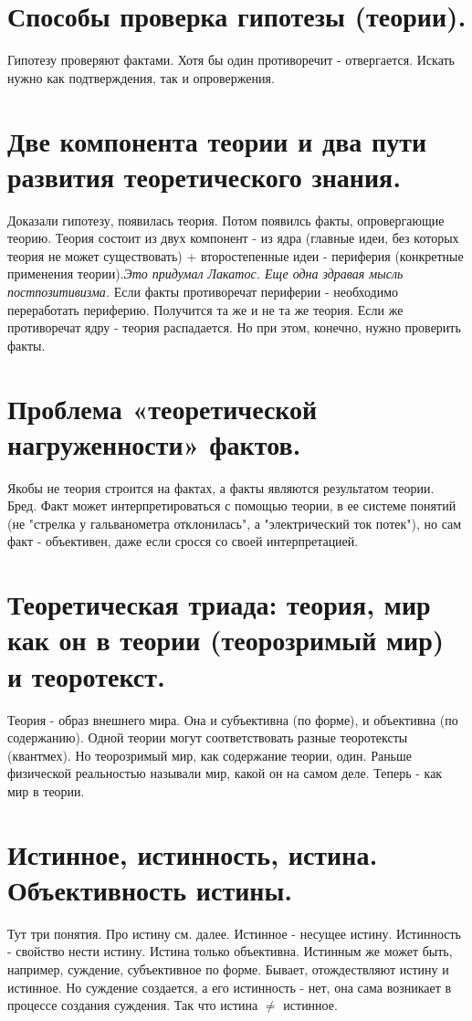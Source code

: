 \section{ Способы проверка гипотезы (теории).}
Гипотезу проверяют фактами. Хотя бы один противоречит - отвергается. Искать нужно как подтверждения, так и опровержения.

\section{ Две компонента теории и два пути развития теоретического знания.}
Доказали гипотезу, появилась теория. Потом появилсь факты, опровергающие теорию. Теория состоит из двух компонент - из ядра (главные идеи, без которых теория не может существовать) + второстепенные идеи - периферия (конкретные применения теории).\textit{Это придумал Лакатос. Еще одна здравая мысль постпозитивизма.} Если факты противоречат периферии - необходимо переработать периферию. Получится та же и не та же теория. Если же противоречат ядру - теория распадается. Но при этом, конечно, нужно проверить факты.

\section{ Проблема «теоретической нагруженности» фактов.}
Якобы не теория строится на фактах, а факты являются результатом теории. Бред. Факт может интерпретироваться с помощью теории, в ее системе понятий (не "стрелка у гальванометра отклонилась", а "электрический ток потек"), но сам факт - объективен, даже если сросся со своей интерпретацией.

\section{ Теоретическая триада: теория, мир как он в теории (теорозримый мир) и теоротекст.}
Теория - образ внешнего мира. Она и субъективна (по форме), и объективна (по содержанию). Одной теории могут соответствовать разные теоротексты (квантмех). Но теорозримый мир, как содержание теории, один.
Раньше физической реальностью называли мир, какой он на самом деле. Теперь - как мир в теории.

\section{ Истинное, истинность, истина. Объективность истины.}
Тут три понятия. Про истину см. далее. Истинное - несущее истину. Истинность - свойство нести истину. Истина только объективна. Истинным же может быть, например, суждение, субъективное по форме. Бывает, отождествляют истину и истинное. Но суждение создается, а его истинность - нет, она сама возникает в процессе создания суждения. Так что истина $\ne$ истинное.

